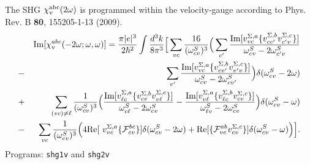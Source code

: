 \documentclass[openany,oneside]{book}
\numberwithin{equation}{section}
\begin{document}
\begin{itemize}
\begin{itemize}
The SHG $\chi_{\mathrm{v}}^{\mathrm{a}\mathrm{b}\mathrm{c}}(2\omega)$ is programmed within the velocity-gauge
 according to Phys.  Rev. B {\bf 80}, 155205-1-13 (2009).
\begin{eqnarray*}
&&\mbox{Im}\lbrack \chi _{\mathrm{v}}^{abc}(-2\omega;\omega,\omega)] 
=\frac{\pi
|e|^{3}}{2\hbar ^{2}}\int \frac{d^{3}k}{8\pi ^{3}}\Big[\sum_{vc}\frac{16}{(
\omega_{cv}^{S})^{3}}\Big(\sum_{c^{\prime }}\frac{\mbox{Im}\lbrack
v_{vc}^{\Sigma ,a}\{v_{cc^{\prime }}^{\Sigma ,b}v_{c^{\prime }v}^{\Sigma
,c}\}]}{\omega_{cv}^{S}-2\omega_{c^{\prime }v}^{S}}  \notag  \label{imchicf} \\
&-&\sum_{v^{\prime }}\frac{\mbox{Im}\lbrack v_{vc}^{\Sigma
,a}\{v_{cv^{\prime }}^{\Sigma ,b}v_{v^{\prime }v}^{\Sigma ,c}\}]}{\omega
_{cv}^{S}-2\omega_{cv^{\prime }}^{S}}\Big)\delta(\omega_{cv}^{S}-2\omega)  \notag \\
&+&\sum_{(vc)\neq\ell }\frac{1}{(\omega_{cv}^{S})^{3}}\Big(\frac{\mbox{Im}\lbrack
v_{\ell c}^{\Sigma ,a}\{v_{cv}^{\Sigma ,b}v_{v\ell }^{\Sigma ,c}\}]}{\omega
_{c\ell }^{S}-2\omega_{cv}^{S}}-\frac{\mbox{Im}\lbrack v_{v\ell }^{\Sigma
,a}\{v_{\ell c}^{\Sigma ,b}v_{cv}^{\Sigma ,c}\}]}{\omega_{\ell v}^{S}-2\omega
_{cv}^{S}}\Big)\delta(\omega_{cv}^{S}-\omega)  \notag \\
&-&\sum_{vc}\frac{1}{(\omega_{cv}^{S})^{3}}\Big(4\mbox{Re}\lbrack \
v_{vc}^{\Sigma ,a}\{\mathcal{F}_{cv}^{bc}\}]\delta(\omega_{cv}^{S}-2\omega)+\mbox{Re}
\lbrack \{\mathcal{F}_{vc}^{ab}v_{cv}^{\Sigma ,c}\}]\delta(\omega_{cv}^{S}-\omega)
\Big)\Big].
\end{eqnarray*}
Programs: \verb=shg1v= and \verb=shg2v=


\end{itemize}
\end{itemize}
\end{document}
